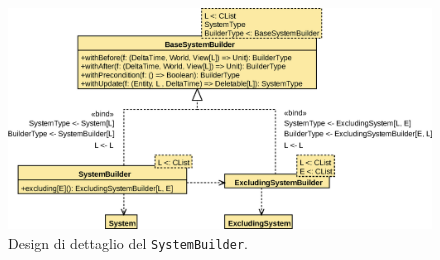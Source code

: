 \begin{figure}[H]
    \centering
    \includegraphics[width=\textwidth]{./img/SystemBuilder}
    \caption{Design di dettaglio del \texttt{SystemBuilder}.}
    \label{fig:system-builder}
\end{figure}
